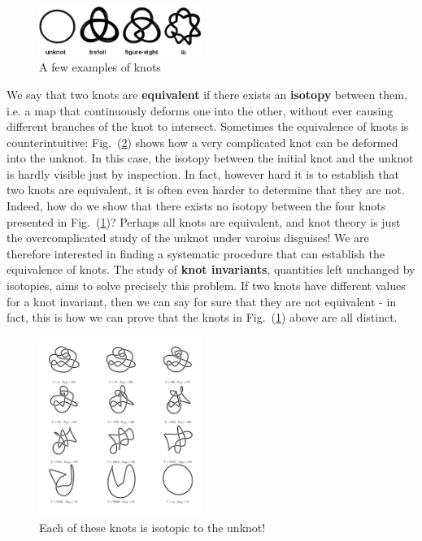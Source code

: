 \documentclass[12pt]{article}
\begin{document}
\begin{figure}[h]
	\centering
	\includegraphics[width=200px]{unknot_trefoil.jpg}
    \caption{A few examples of knots}
    \label{fig:knots}
\end{figure}
We say that two knots are \textbf{equivalent} if there exists an \textbf{isotopy} between them, i.e. a map that continuously deforms one into the other, without ever causing different branches of the knot to intersect. Sometimes the equivalence of knots is counterintuitive: Fig.~(\ref{fig:isotopy}) shows how a very complicated knot can be deformed into the unknot. In this case, the isotopy between the initial knot and the unknot is hardly visible just by inspection. In fact, however hard it is to establish that two knots are equivalent, it is often even harder to determine that they are not. Indeed, how do we show that there exists no isotopy between the four knots presented in Fig.~(\ref{fig:knots})? Perhaps all knots are equivalent, and knot theory is just the overcomplicated study of the unknot under varoius disguises! We are therefore interested in finding a systematic procedure that can establish the equivalence of knots. The study of \textbf{knot invariants}, quantities left unchanged by isotopies, aims to solve precisely this problem. If two knots have different values for a knot invariant, then we can say for sure that they are not equivalent - in fact, this is how we can prove that the knots in Fig.~(\ref{fig:knots}) above are all distinct.
\begin{figure}[h]
	\centering
	\includegraphics[width=200px]{unknot.jpg}
    \caption{Each of these knots is isotopic to the unknot!}
    \label{fig:isotopy}
\end{figure}
\\
\end{document}
